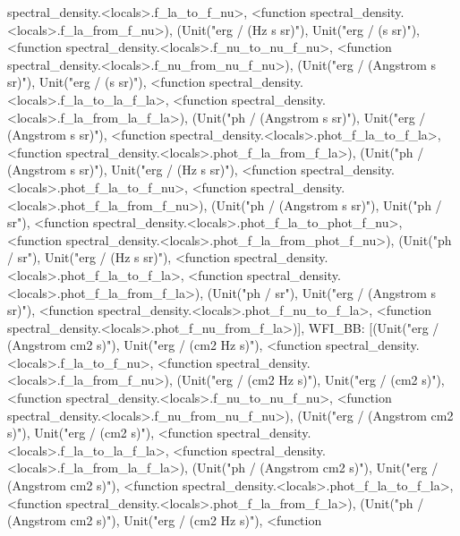 \documentclass[letterpaper,10pt,english]{sphinxmanual}
\begin{document}
\begin{fulllineitems}
spectral\_density.\textless{}locals\textgreater{}.f\_la\_to\_f\_nu\textgreater{}, \textless{}function spectral\_density.\textless{}locals\textgreater{}.f\_la\_from\_f\_nu\textgreater{}), (Unit("erg / (Hz s sr)"), Unit("erg / (s sr)"), \textless{}function spectral\_density.\textless{}locals\textgreater{}.f\_nu\_to\_nu\_f\_nu\textgreater{}, \textless{}function spectral\_density.\textless{}locals\textgreater{}.f\_nu\_from\_nu\_f\_nu\textgreater{}), (Unit("erg / (Angstrom s sr)"), Unit("erg / (s sr)"), \textless{}function spectral\_density.\textless{}locals\textgreater{}.f\_la\_to\_la\_f\_la\textgreater{}, \textless{}function spectral\_density.\textless{}locals\textgreater{}.f\_la\_from\_la\_f\_la\textgreater{}), (Unit("ph / (Angstrom s sr)"), Unit("erg / (Angstrom s sr)"), \textless{}function spectral\_density.\textless{}locals\textgreater{}.phot\_f\_la\_to\_f\_la\textgreater{}, \textless{}function spectral\_density.\textless{}locals\textgreater{}.phot\_f\_la\_from\_f\_la\textgreater{}), (Unit("ph / (Angstrom s sr)"), Unit("erg / (Hz s sr)"), \textless{}function spectral\_density.\textless{}locals\textgreater{}.phot\_f\_la\_to\_f\_nu\textgreater{}, \textless{}function spectral\_density.\textless{}locals\textgreater{}.phot\_f\_la\_from\_f\_nu\textgreater{}), (Unit("ph / (Angstrom s sr)"), Unit("ph / sr"), \textless{}function spectral\_density.\textless{}locals\textgreater{}.phot\_f\_la\_to\_phot\_f\_nu\textgreater{}, \textless{}function spectral\_density.\textless{}locals\textgreater{}.phot\_f\_la\_from\_phot\_f\_nu\textgreater{}), (Unit("ph / sr"), Unit("erg / (Hz s sr)"), \textless{}function spectral\_density.\textless{}locals\textgreater{}.phot\_f\_la\_to\_f\_la\textgreater{}, \textless{}function spectral\_density.\textless{}locals\textgreater{}.phot\_f\_la\_from\_f\_la\textgreater{}), (Unit("ph / sr"), Unit("erg / (Angstrom s sr)"), \textless{}function spectral\_density.\textless{}locals\textgreater{}.phot\_f\_nu\_to\_f\_la\textgreater{}, \textless{}function spectral\_density.\textless{}locals\textgreater{}.phot\_f\_nu\_from\_f\_la\textgreater{}){]}, \textquotesingle{}WFI\_BB\textquotesingle{}: {[}(Unit("erg / (Angstrom cm2 s)"), Unit("erg / (cm2 Hz s)"), \textless{}function spectral\_density.\textless{}locals\textgreater{}.f\_la\_to\_f\_nu\textgreater{}, \textless{}function spectral\_density.\textless{}locals\textgreater{}.f\_la\_from\_f\_nu\textgreater{}), (Unit("erg / (cm2 Hz s)"), Unit("erg / (cm2 s)"), \textless{}function spectral\_density.\textless{}locals\textgreater{}.f\_nu\_to\_nu\_f\_nu\textgreater{}, \textless{}function spectral\_density.\textless{}locals\textgreater{}.f\_nu\_from\_nu\_f\_nu\textgreater{}), (Unit("erg / (Angstrom cm2 s)"), Unit("erg / (cm2 s)"), \textless{}function spectral\_density.\textless{}locals\textgreater{}.f\_la\_to\_la\_f\_la\textgreater{}, \textless{}function spectral\_density.\textless{}locals\textgreater{}.f\_la\_from\_la\_f\_la\textgreater{}), (Unit("ph / (Angstrom cm2 s)"), Unit("erg / (Angstrom cm2 s)"), \textless{}function spectral\_density.\textless{}locals\textgreater{}.phot\_f\_la\_to\_f\_la\textgreater{}, \textless{}function spectral\_density.\textless{}locals\textgreater{}.phot\_f\_la\_from\_f\_la\textgreater{}), (Unit("ph / (Angstrom cm2 s)"), Unit("erg / (cm2 Hz s)"), \textless{}function 
\end{fulllineitems}
\end{document}
